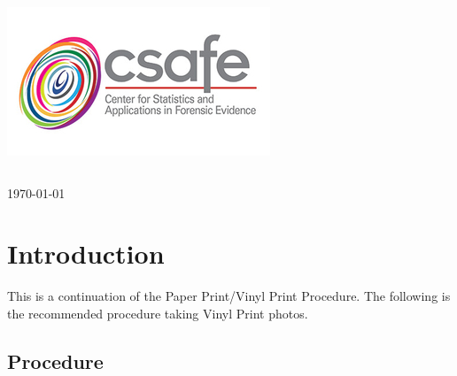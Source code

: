\begin{titlepage}
\includegraphics[scale=.5]{Logo}\\[1cm]

\begin{center}
\begin{tabular}{ c   |   c } 
 
\end{tabular}
\end{center}

{\large \today}\\[2cm] %


\vfill %

\end{titlepage}




\section{Introduction}

This is a continuation of the Paper Print/Vinyl Print Procedure. The following is the recommended procedure taking Vinyl Print photos.

\subsection{Procedure}

